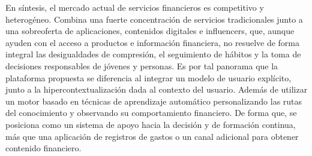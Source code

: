 En síntesis, el mercado actual de servicios financieros es competitivo y heterogéneo. Combina una fuerte concentración de servicios tradicionales junto a una sobreoferta de aplicaciones, contenidos digitales e influencers, que, aunque ayuden con el acceso a productos e información financiera, no resuelve de forma integral las desigualdades de compresión, el seguimiento de hábitos y la toma de decisiones responsables de jóvenes y personas. Es por tal panorama que la plataforma propuesta se diferencia al integrar un modelo de usuario explícito, junto a la hipercontextualización dada al contexto del usuario. Además de utilizar un motor basado en técnicas de aprendizaje automático personalizando las rutas del conocimiento y observando su comportamiento financiero. De forma que, se posiciona como un sistema de apoyo hacia la decisión y de formación continua, más que una aplicación de registros de gastos o un canal adicional para obtener contenido financiero.